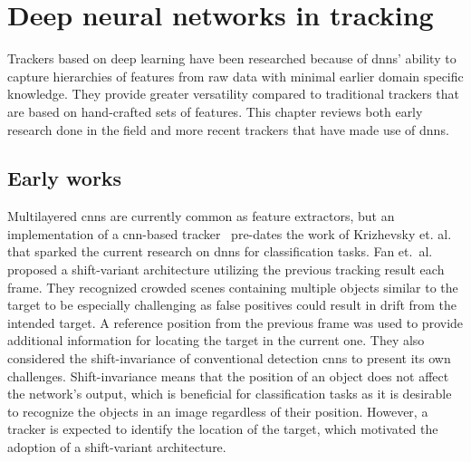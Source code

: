 \section{Deep neural networks in tracking}
Trackers based on deep learning have been researched because of \ac{dnn}s' ability
to capture hierarchies of features from raw data with minimal earlier domain specific
knowledge. They provide greater versatility compared to traditional trackers that are
based on hand-crafted sets of features. This chapter reviews both early research
done in the field and more recent trackers that have made use of \ac{dnn}s.

\subsection{Early works}
Multilayered \ac{cnn}s are currently common as feature extractors, but an implementation
of a \ac{cnn}-based tracker~\cite{HUMAN_CNN} pre-dates the work of Krizhevsky et.
al.~\cite{NIPS_IMAGENET} that sparked the current research on \ac{dnn}s for classification
tasks. Fan et.~al.~\cite{HUMAN_CNN} proposed a shift-variant architecture utilizing the
previous tracking result each frame. They recognized crowded scenes containing multiple
objects similar to the target to be especially challenging as false positives could result
in drift from the intended target. A reference position from the previous frame was used
to provide additional information for locating the target in the current one. They also
considered the shift-invariance of conventional detection \ac{cnn}s to present its
own challenges. Shift-invariance means that the position of an object does not affect the
network's output, which is beneficial for classification tasks as it is desirable to
recognize the objects in an image regardless of their position. However, a tracker is
expected to identify the location of the target, which motivated the adoption of a
shift-variant architecture.~\cite{HUMAN_CNN}


